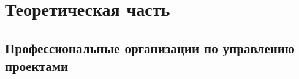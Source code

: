 \section{Теоретическая часть}
\subsection{Профессиональные организации по управлению проектами}







